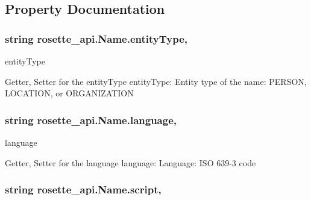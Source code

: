 \subsection{Property Documentation}
\hypertarget{classrosette__api_1_1_name_afae65803ecc7dd2b6f52a534fd343a7e}{}
\subsubsection[{entity\+Type}]{\setlength{\rightskip}{0pt plus 5cm}string rosette\+\_\+api.\+Name.\+entity\+Type\hspace{0.3cm}{\ttfamily [get]}, {\ttfamily [set]}}\label{classrosette__api_1_1_name_afae65803ecc7dd2b6f52a534fd343a7e}


entity\+Type 

Getter, Setter for the entity\+Type entity\+Type\+: Entity type of the name\+: P\+E\+R\+S\+O\+N, L\+O\+C\+A\+T\+I\+O\+N, or O\+R\+G\+A\+N\+I\+Z\+A\+T\+I\+O\+N \hypertarget{classrosette__api_1_1_name_ad3b22b7edc76c5494e4ade85ea007889}{}
\subsubsection[{language}]{\setlength{\rightskip}{0pt plus 5cm}string rosette\+\_\+api.\+Name.\+language\hspace{0.3cm}{\ttfamily [get]}, {\ttfamily [set]}}\label{classrosette__api_1_1_name_ad3b22b7edc76c5494e4ade85ea007889}


language 

Getter, Setter for the language language\+: Language\+: I\+S\+O 639-\/3 code \hypertarget{classrosette__api_1_1_name_a5e9aba5fc1f32ad0fcf6e0bf14ce7afd}{}
\subsubsection[{script}]{\setlength{\rightskip}{0pt plus 5cm}string rosette\+\_\+api.\+Name.\+script\hspace{0.3cm}{\ttfamily [get]}, {\ttfamily [set]}}\label{classrosette__api_1_1_name_a5e9aba5fc1f32ad0fcf6e0bf14ce7afd}


